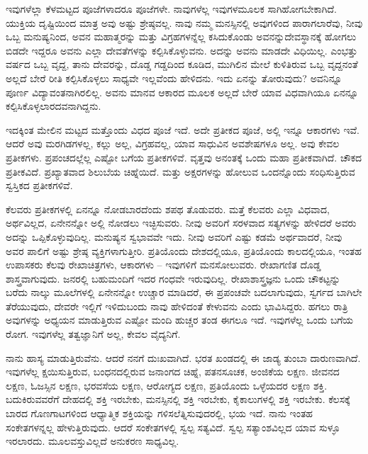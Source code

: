 ಇವುಗಳೆಲ್ಲಾ ಕೆಳಮಟ್ಟದ ಪೂಜೆಗಳಾದರೂ ಪೂಜೆಗಳೇ. ನಾವುಗಳೆಲ್ಲ ಇವುಗಳ\break ಮೂಲಕ ಸಾಗಿಹೋಗಬೇಕಾಗಿದೆ. ಯುಕ್ತಿಯ ದೃಷ್ಟಿಯಿಂದ ಮಾತ್ರ ಅವು ಅಷ್ಟು ಶ್ರೇಷ್ಠವಲ್ಲ. ನಾವು ನಮ್ಮ ಮನಸ್ಸಿನಲ್ಲಿ ಅವುಗಳಿಂದ ಪಾರಾಗಲಾರೆವು, ನೀವು ಒಬ್ಬ ಮನುಷ್ಯನಿಂದ, ಅವನ ಮಹಾತ್ಮರನ್ನು ಮತ್ತು ವಿಗ್ರಹಗಳನ್ನೆಲ್ಲ ಕಸಿದುಕೊಂಡು ಅವನನ್ನು\break ದೇವಸ್ಥಾನಕ್ಕೆ ಹೋಗಲು ಬಿಡದೇ ಇದ್ದರೂ ಅವನು ಎಲ್ಲಾ ದೇವತೆಗಳನ್ನು ಕಲ್ಪಿಸಿಕೊಳ್ಳುವನು. ಅದನ್ನು ಅವನು ಮಾಡದೇ ವಿಧಿಯಿಲ್ಲ. ಎಂಭತ್ತು ವರ್ಷದ ಒಬ್ಬ ವೃದ್ದ, ತಾನು ದೇವರನ್ನು, ದೊಡ್ಡ ಗಡ್ಡದಿಂದ ಕೂಡಿದ, ಮುಗಿಲಿನ ಮೇಲೆ ಕುಳಿತಿರುವ ಒಬ್ಬ ವೃದ್ದನಂತೆ ಅಲ್ಲದೆ ಬೇರೆ ರೀತಿ ಕಲ್ಪಿಸಿಕೊಳ್ಳಲು ಸಾಧ್ಯವೇ ಇಲ್ಲವೆಂದು ಹೇಳಿದನು. ಇದು ಏನನ್ನು ತೋರುವುದು? ಅವನಿನ್ನೂ ಪೂರ್ಣ ವಿದ್ಯಾವಂತನಾಗಿರಲಿಲ್ಲ. ಅವನು ಮಾನವ ಆಕಾರದ ಮೂಲಕ ಅಲ್ಲದೆ ಬೇರೆ ಯಾವ ವಿಧವಾಗಿಯೂ ಏನನ್ನೂ ಕಲ್ಪಿಸಿಕೊಳ್ಳಲಾರದವನಾಗಿದ್ದನು.

ಇದಕ್ಕಿಂತ ಮೇಲಿನ ಮಟ್ಟದ ಮತ್ತೊಂದು ವಿಧದ ಪೂಜೆ ಇದೆ. ಅದೇ ಪ್ರತೀಕದ ಪೂಜೆ, ಅಲ್ಲಿ ಇನ್ನೂ ಆಕಾರಗಳು ಇವೆ. ಆದರೆ ಅವು ಮರಗಿಡಗಳಲ್ಲ, ಕಲ್ಲು ಅಲ್ಲ, ವಿಗ್ರಹವಲ್ಲ, ಯಾವ ಸಾಧುವಿನ ಅವಶೇಷಗಳೂ ಅಲ್ಲ. ಅವು ಕೇವಲ ಪ್ರತೀಕಗಳು. ಪ್ರಪಂಚದಲ್ಲೆಲ್ಲ ಎಷ್ಟೋ ಬಗೆಯ ಪ್ರತೀಕಗಳಿವೆ. ವೃತ್ತವು ಅನಂತಕ್ಕೆ ಒಂದು ಮಹಾ ಪ್ರತೀಕವಾಗಿದೆ. ಚೌಕದ ಪ್ರತೀಕವಿದೆ. ಪ್ರಖ್ಯಾತವಾದ ಶಿಲುಬೆಯ ಚಿಹ್ನೆಯಿದೆ.  ಮತ್ತು  ಅಕ್ಷರಗಳನ್ನು ಹೋಲುವ ಒಂದನ್ನೊಂದು ಸಂಧಿಸುತ್ತಿರುವ ಸ್ವಸ್ತಿಕದ ಪ್ರತೀಕಗಳಿವೆ.

ಕೆಲವರು ಪ್ರತೀಕಗಳಲ್ಲಿ ಏನನ್ನೂ ನೋಡಬಾರದೆಂದು ಶಪಥ ತೊಡುವರು. ಮತ್ತೆ ಕೆಲವರು ಎಲ್ಲಾ ವಿಧವಾದ, ಅರ್ಥವಿಲ್ಲದ, ಏನೇನನ್ನೋ ಅಲ್ಲಿ ನೋಡಲು ಇಚ್ಛಿಸುವರು. ನೀವು ಅವರಿಗೆ ಸರಳವಾದ ಸತ್ಯಗಳನ್ನು ಹೇಳಿದರೆ ಅವರು ಅದನ್ನು ಒಪ್ಪಿಕೊಳ್ಳುವುದಿಲ್ಲ. ಮನುಷ್ಯನ ಸ್ವಭಾವವೇ ಇದು. ನೀವು ಅವರಿಗೆ ಎಷ್ಟು ಕಡಮೆ ಅರ್ಥವಾದರೆ, ನೀವು ಅವರ ಪಾಲಿಗೆ ಅಷ್ಟು ಶ್ರೇಷ್ಠ ವ್ಯಕ್ತಿಗಳಾಗುತ್ತೀರಿ. ಪ್ರತಿಯೊಂದು ದೇಶದಲ್ಲಿಯೂ, ಪ್ರತಿಯೊಂದು ಕಾಲದಲ್ಲಿಯೂ, ಇಂತಹ ಉಪಾಸಕರು ಕೆಲವು ರೇಖಾಚಿತ್ರಗಳು, ಆಕಾರಗಳು – ಇವುಗಳಿಗೆ ಮನಸೋಲುವರು. ರೇಖಾಗಣಿತ ದೊಡ್ಡ ಶಾಸ್ತ್ರವಾಗುವುದು. ಜನರಲ್ಲಿ ಬಹುಮಂದಿಗೆ ಇದರ ಗಂಧವೇ ಇರುವುದಿಲ್ಲ. ರೇಖಾಶಾಸ್ತ್ರಜ್ಞನು ಒಂದು ಚೌಕಟ್ಟನ್ನು ಬರೆದು ನಾಲ್ಕು ಮೂಲೆಗಳಲ್ಲಿ ಏನೇನನ್ನೋ ಉಚ್ಚಾರ ಮಾಡಿದರೆ, ಈ ಪ್ರಪಂಚವೇ ಬದಲಾಗುವುದು, ಸ್ವರ್ಗದ ಬಾಗಿಲೇ ತೆರೆಯುವುದು, ದೇವರೇ ಇಲ್ಲಿಗೆ ಇಳಿದುಬಂದು ನಾವು ಹೇಳಿದಂತೆ ಕೇಳುವನು ಎಂದು ಭಾವಿಸಿದ್ದರು. ಹಗಲು ರಾತ್ರಿ ಅವುಗಳನ್ನು ಅಧ್ಯಯನ ಮಾಡುತ್ತಿರುವ ಎಷ್ಟೋ ಮಂದಿ ಹುಚ್ಚರ ತಂಡ ಈಗಲೂ ಇದೆ. ಇವುಗಳೆಲ್ಲ ಒಂದು ಬಗೆಯ ರೋಗ. ಇವುಗಳೆಲ್ಲ ತತ್ವಜ್ಞಾನಿಗೆ ಅಲ್ಲ, ಕೇವಲ ವೈದ್ಯನಿಗೆ.

ನಾನು ಹಾಸ್ಯ ಮಾಡುತ್ತಿರುವೆನು. ಆದರೆ ನನಗೆ ದುಃಖವಾಗಿದೆ. ಭರತ ಖಂಡದಲ್ಲಿ ಈ ಜಾಡ್ಯ ತುಂಬಾ ದಾರುಣವಾಗಿದೆ. ಇವುಗಳೆಲ್ಲ ಕ್ಷಯಿಸುತ್ತಿರುವ, ಬಂಧನದಲ್ಲಿರುವ ಜನಾಂಗದ ಚಿಹ್ನೆ, ಪತನಸೂಚಕ, ಅಂಜಿಕೆಯ ಲಕ್ಷಣ. ಜೀವನದ ಲಕ್ಷಣ, ಓಜಸ್ಸಿನ ಲಕ್ಷಣ, ಭರವಸೆಯ ಲಕ್ಷಣ, ಆರೋಗ್ಯದ ಲಕ್ಷಣ, ಪ್ರತಿಯೊಂದು ಒಳ್ಳೆಯದರ ಲಕ್ಷಣ ಶಕ್ತಿ. ಬದುಕಿರುವವರೆಗೆ ದೇಹದಲ್ಲಿ ಶಕ್ತಿ ಇರಬೇಕು, ಮನಸ್ಸಿನಲ್ಲಿ ಶಕ್ತಿ ಇರಬೇಕು, ಕೈಕಾಲುಗಳಲ್ಲಿ ಶಕ್ತಿ ಇರಬೇಕು. ಕೆಲಸಕ್ಕೆ ಬಾರದ ಗೊಣಗಾಟಗಳಿಂದ ಆಧ್ಯಾತ್ಮಿಕ ಶಕ್ತಿಯನ್ನು ಗಳಿಸಲೆತ್ನಿಸುವುದರಲ್ಲಿ, ಭಯ ಇದೆ. ನಾನು ಇಂತಹ ಸಂಕೇತಗಳನ್ನಲ್ಲ ಹೇಳುತ್ತಿರುವುದು. ಆದರೆ ಸಂಕೇತಗಳಲ್ಲಿ ಸ್ವಲ್ಪ ಸತ್ಯವಿದೆ. ಸ್ವಲ್ಪ ಸತ್ಯಾಂಶವಿಲ್ಲದ ಯಾವ ಸುಳ್ಳೂ ಇರಲಾರದು. ಮೂಲವಸ್ತುವಿಲ್ಲದೆ ಅನುಕರಣ ಸಾಧ್ಯವಿಲ್ಲ.


